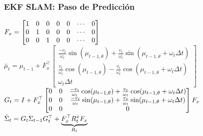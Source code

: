 \begin{frame}
    \frametitle{EKF SLAM: Paso de Predicción}

    \begin{algorithmic}[1]
        \State $F_{x} = \begin{bmatrix}
        1 & 0 & 0 & 0 & 0 & \cdots & 0 \\
        0 & 1 & 0 & 0 & 0 & \cdots & 0 \\
        0 & 0 & 1 & 0 & 0 & \cdots & 0 \\
        \end{bmatrix}$
        \vspace{1em}
        \State $\bar{\mu}_t = \mu_{t-1} + F_x^{\top}
        \begin{bmatrix}
        \frac{-v_t}{\omega_t} \sin(\mu_{t-1,\theta}) + \frac{v_t}{\omega_t} \sin(\mu_{t-1,\theta} + \omega_t \Delta t) \\
        \frac{v_t}{\omega_t} \cos(\mu_{t-1,\theta}) - \frac{v_t}{\omega_t} \cos(\mu_{t-1,\theta} + \omega_t \Delta t) \\
        \omega_t \Delta t
        \end{bmatrix}$
        \vspace{1em}
        \State $G_t = I + F_{x}^{\top}
        \begin{bmatrix}
        0 & 0 & \frac{-v_t}{\omega_t} \cos(\mu_{t-1,\theta}) + \frac{v_t}{\omega_t} \cos(\mu_{t-1,\theta} + \omega_t \Delta t) \\
        0 & 0 & \frac{-v_t}{\omega_t} \sin(\mu_{t-1,\theta}) + \frac{v_t}{\omega_t} \sin(\mu_{t-1,\theta} + \omega_t \Delta t) \\
        0 & 0 & 0
        \end{bmatrix} F_{x}$
        \vspace{1em}
        \State $\bar{\Sigma}_t = G_{t} \Sigma_{t-1} G_{t}^{\top} + \underbrace{F_{x}^{\top} R_{t}^{x} F_{x}}_{R_t}$
        \EndProcedure
    \end{algorithmic}
    
\end{frame}

